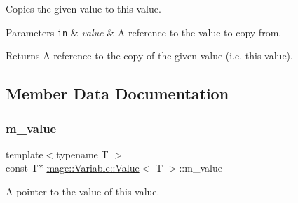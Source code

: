 Copies the given value to this value.


\begin{DoxyParams}[1]{Parameters}
\mbox{\tt in}  & {\em value} & A reference to the value to copy from. \\
\hline
\end{DoxyParams}
\begin{DoxyReturn}{Returns}
A reference to the copy of the given value (i.\+e. this value). 
\end{DoxyReturn}


\subsection{Member Data Documentation}
\hypertarget{structmage_1_1_variable_1_1_value_aa15243b8811b108a0c7bff05456e377c}{}\label{structmage_1_1_variable_1_1_value_aa15243b8811b108a0c7bff05456e377c} 
\subsubsection{\texorpdfstring{m\+\_\+value}{m\_value}}
{\footnotesize\ttfamily template$<$typename T $>$ \\
const T$\ast$ \hyperlink{structmage_1_1_variable_1_1_value}{mage\+::\+Variable\+::\+Value}$<$ T $>$\+::m\+\_\+value\hspace{0.3cm}{\ttfamily [private]}}

A pointer to the value of this value. 